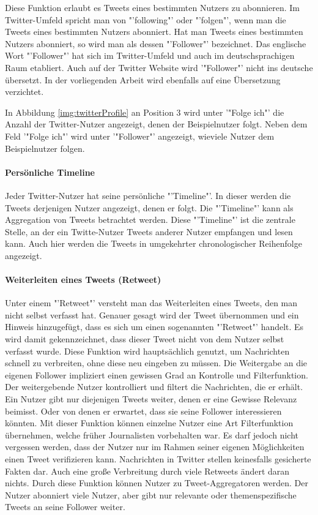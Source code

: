 				Diese Funktion erlaubt es Tweets eines bestimmten Nutzers zu abonnieren. 
				Im Twitter-Umfeld spricht man von "'following"' oder "'folgen"', wenn man die Tweets eines bestimmten Nutzers abonniert.
				Hat man Tweets eines bestimmten Nutzers abonniert, so wird man als dessen "'Follower"' bezeichnet. 
				Das englische Wort "'Follower"' hat sich im Twitter-Umfeld und auch im deutschsprachigen Raum etabliert. 
				Auch auf der Twitter Website wird '"Follower"' nicht ins deutsche übersetzt.
				In der vorliegenden Arbeit wird ebenfalls auf eine Übersetzung verzichtet. 

				In Abbildung \ref{img:twitterProfile} an Position 3 wird unter '"Folge ich"' die Anzahl der Twitter-Nutzer angezeigt, denen der Beispielnutzer folgt. 
				Neben dem Feld '"Folge ich"' wird unter '"Follower"' angezeigt, wieviele Nutzer dem Beispielnutzer folgen.

			\paragraph{Persönliche Timeline}
				Jeder Twitter-Nutzer hat seine persönliche "'Timeline"'.
				In dieser werden die Tweets derjenigen Nutzer angezeigt, denen er folgt. 
				Die "'Timeline"' kann als Aggregation von Tweets betrachtet werden.
				Diese "'Timeline"' ist die zentrale Stelle, an der ein Twitte-Nutzer Tweets anderer Nutzer empfangen und lesen kann.
				Auch hier werden die Tweets in umgekehrter chronologischer Reihenfolge angezeigt.  

			\paragraph{Weiterleiten eines Tweets (Retweet)}

				Unter einem "'Retweet"' versteht man das Weiterleiten eines Tweets, den man nicht selbst verfasst hat.
				Genauer gesagt wird der Tweet übernommen und ein Hinweis hinzugefügt, dass es sich um einen sogenannten "'Retweet"' handelt.
				Es wird damit gekennzeichnet, dass dieser Tweet nicht von dem Nutzer selbst verfasst wurde.
				Diese Funktion wird hauptsächlich genutzt, um Nachrichten schnell zu verbreiten, ohne diese neu eingeben zu müssen. 
				Die Weitergabe an die eigenen Follower impliziert einen gewissen Grad an Kontrolle und Filterfunktion. 
				Der weitergebende Nutzer kontrolliert und filtert die Nachrichten, die er erhält.
				Ein Nutzer gibt nur diejenigen Tweets weiter, denen er eine Gewisse Relevanz beimisst.
				Oder von denen er erwartet, dass sie seine Follower interessieren könnten. 
				Mit dieser Funktion können einzelne Nutzer eine Art Filterfunktion übernehmen, welche früher Journalisten vorbehalten war. 
				Es darf jedoch nicht vergessen werden, dass der Nutzer nur im Rahmen seiner eigenen Möglichkeiten einen Tweet verifizieren kann.
				Nachrichten in Twitter stellen keinesfalls gesicherte Fakten dar.
				Auch eine große Verbreitung durch viele Retweets ändert daran nichts.
				Durch diese Funktion können Nutzer zu Tweet-Aggregatoren werden.
				Der Nutzer abonniert viele Nutzer, aber gibt nur relevante oder themenspezifische Tweets an seine Follower weiter. 

